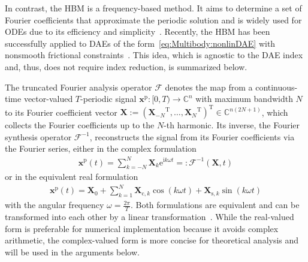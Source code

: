 \documentclass[a4paper, nonatbib, 3p, twocolumn]{elsarticle}
\theoremstyle{plain}
\theoremstyle{definition}
\theoremstyle{remark}
\newcommand{\T}{^{\mathop{\mathrm{T}}}}
\newcommand{\ic}{\ri} %
\newcommand{\ex}{\re} %
\newcommand{\Cspace}{\mathbb{C}}
\newcommand{\rc}{\mathrm c}
\newcommand{\re}{\mathrm e}
\newcommand{\ri}{\mathrm i}
\newcommand{\rp}{\mathrm p}
\newcommand{\rs}{\mathrm s}
\newcommand{\vx}{\mathbf x}
\newcommand{\vX}{\mathbf X}
\newcommand{\cF}{\mathcal{F}}
\begin{document}
In contrast, the HBM is a frequency-based method. It aims to determine a set of Fourier coefficients that approximate the periodic solution and is widely used for ODEs due to its efficiency and simplicity~\cite{Detroux2015,Kerschen2009,Krack2019,Lazarus2010,Peletan2013}. Recently, the HBM has been successfully applied to DAEs of the form~\eqref{eq:Multibody:nonlinDAE} with nonsmooth frictional constraints~\cite{Legrand2024,Hashemi2025}. This idea, which is agnostic to the DAE index and, thus, does not require index reduction, is summarized below.

The truncated Fourier analysis operator $\cF$ denotes the map from a continuous-time vector-valued $T$-periodic signal $\vx^{\rp}: [0, T) \rightarrow \Cspace^n$ with maximum bandwidth $N$ to its Fourier coefficient vector $\vX := \left({\vX_{-N}}\T, \dots, {\vX_N }\T\right)\T {\in \Cspace^{n (2N+1)}}$, which collects the Fourier coefficients up to the $N$-th harmonic. Its inverse, the Fourier synthesis operator $\cF^{-1}$,  reconstructs the signal from its Fourier coefficients via the Fourier series,
either in the complex formulation
\begin{align}\label{eq:def_xp:cplx}
	\vx^\rp(t) = \sum_{k = -N}^{N} \vX_k \ex^{\ic k \omega t} =: \cF^{-1}(\vX,t)
\end{align}
or in the equivalent real formulation
\begin{align}\label{eq:def_xp:real}
	\vx^\rp(t) = \vX_0 + \sum_{k = 1}^{N} \vX_{\rc, k} \cos(k \omega t) + \vX_{\rs, k} \sin(k \omega t)
\end{align}
with the angular frequency $\omega = \frac{2\pi}{T}$. 
Both formulations are equivalent and can be transformed into each other by a linear transformation~\cite{Bayer2024}. While the real-valued form is preferable for numerical implementation because it avoids complex arithmetic, the complex-valued form is more concise for theoretical analysis and will be used in the arguments below. 
\end{document}
